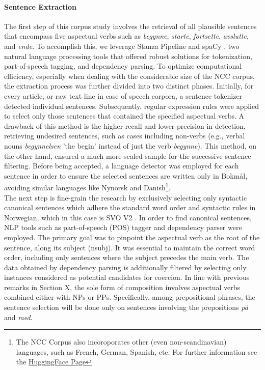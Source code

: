 \documentclass{article}
\begin{document}
\paragraph{Sentence Extraction}
The first step of this corpus study involves the retrieval of all plausible sentences that encompass five aspectual verbs such as \textit{begynne}, \textit{starte}, \textit{fortsette}, \textit{avslutte}, and \textit{ende}. 
To accomplish this, we leverage Stanza Pipeline \parencite{qi_stanza_2020} and spaCy \parencite{honnibal_spacy_2017}, two natural language processing tools that offered robust solutions for tokenization, part-of-speech tagging, and dependency parsing. To optimize computational efficiency, especially when dealing with the considerable size of the NCC corpus, the extraction process was further divided into two distinct phases. Initially, for every article, or raw text line in case of speech corpora, a sentence tokenizer detected individual sentences. Subsequently, regular expression rules were applied to select only those sentences that contained the specified aspectual verbs. 
A drawback of this method is the higher recall and lower precision in detection, retrieving undesired sentences, such as cases including non-verbs (e.g., verbal nouns \textit{begynnelsen} 'the begin' instead of just the verb \textit{begynne}). This method, on the other hand, ensured a much more scaled sample for the successive sentence filtering. Before being accepted, a language detector was employed for each sentence in order to ensure the selected sentences are written only in Bokmål, avoiding similar languages like Nynorsk and Danish\footnote{The NCC Corpus also incoroporates other (even non-scandinavian) languages, such as French, German, Spanish, etc. For further information see the \href{https://huggingface.co/datasets/NbAiLab/NCC}{HuggingFace Page}}.\\
The next step is fine-grain the research by exclusively selecting only syntactic canonical sentences which adhere the standard word order and syntactic rules in Norwegian, which in this case is SVO V2 \parencite[pp. 858-862]{faarlund_norsk_1997}. In order to find canonical sentences, NLP tools such as part-of-speech (POS) tagger and dependency parser were employed. The primary goal was to pinpoint the aspectual verb as the root of the sentence, along its subject (nsubj). It was essential to maintain the correct word order, including only sentences where the subject precedes the main verb. The data obtained by dependency parsing is additionally filtered by selecting only instances considered as potential candidates for coercion. In line with previous remarks in Section X, the sole form of composition involves aspectual verbs combined either with NPs or PPs. Specifically, among prepositional phrases, the sentence selection  will be done only on sentences involving the prepositions \emph{på} and \emph{med}. 
\end{document}
